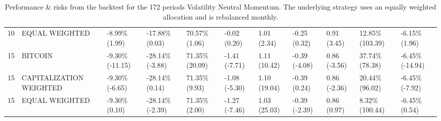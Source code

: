 \documentclass{article}
\begin{document}
\begin{landscape}
\begin{table}[H]
\begin{tabular}{p{0.4cm}|p{3cm}|p{1.65cm}|p{1.65cm}|p{1.65cm}|p{1.65cm}|p{1.65cm}|p{1.65cm}|p{1.65cm}|p{1.65cm}|p{1.65cm}}
\\ 
10&EQUAL WEIGHTED&-8.99\% (1.99)&-17.88\% (0.03)&70.57\% (1.06)&-0.02 (0.20)&1.01 (2.34)&-0.25 (0.32)&0.91 (3.45)&12.85\% (103.39)&-6.15\% (1.96)
\\ 
15&BITCOIN&-9.30\% (-11.15)&-28.14\% (-3.88)&71.35\% (20.09)&-1.41 (-7.71)&1.11 (10.42)&-0.39 (-4.08)&0.86 (-3.56)&37.74\% (78.38)&-6.45\% (-14.94)
\\ 
15&CAPITALIZATION WEIGHTED&-9.30\% (-6.65)&-28.14\% (0.14)&71.35\% (9.93)&-1.08 (-5.30)&1.10 (19.04)&-0.39 (0.24)&0.86 (-2.36)&20.44\% (96.02)&-6.45\% (-7.92)
\\ 
15&EQUAL WEIGHTED&-9.30\% (0.10)&-28.14\% (-2.39)&71.35\% (2.00)&-1.27 (-7.46)&1.03 (25.03)&-0.39 (-2.39)&0.86 (0.97)&8.32\% (100.44)&-6.45\% (0.54)
\\ 
    \bottomrule
  \end{tabular}
  \label{tab:volneutmom172equalweight}
   \caption{Performance \& risks from the backtest for the 172 periods Volatility Neutral Momentum. The underlying strategy uses an equally weighted allocation and is rebalanced monthly.}
\end{table}
\end{landscape}
\end{document}
